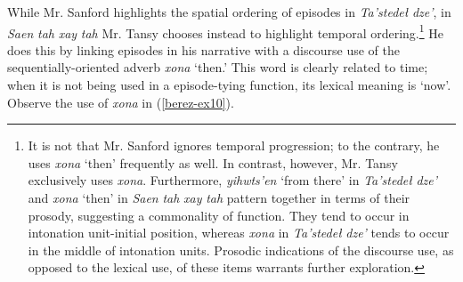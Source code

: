 While Mr. Sanford highlights the spatial ordering of episodes in \textit{Ta’stedeł} \textit{dze’}, in \textit{Saen} \textit{tah} \textit{xay} \textit{tah} Mr. Tansy chooses instead to highlight temporal ordering.\footnote{It is not that Mr. Sanford ignores temporal progression; to the contrary, he uses \textit{xona} ‘then’ frequently as well. In contrast, however, Mr. Tansy exclusively uses \textit{xona}. Furthermore, \textit{yihwts’en} ‘from there’ in \textit{Ta’stedeł} \textit{dze’} and \textit{xona} ‘then’ in \textit{Saen} \textit{tah} \textit{xay} \textit{tah} pattern together in terms of their prosody, suggesting a commonality of function. They tend to occur in intonation unit-initial position, whereas \textit{xona} in \textit{Ta’stedeł} \textit{dze’} tends to occur in the middle of intonation units. Prosodic indications of the discourse use, as opposed to the lexical use, of these items warrants further exploration.} He does this by linking episodes in his narrative with a discourse use of the sequentially-oriented adverb \textit{xona} ‘then.’ This word is clearly related to time; when it is not being used in a episode-tying function, its lexical meaning is ‘now’. Observe the use of \textit{xona} in (\ref{berez-ex10}).

